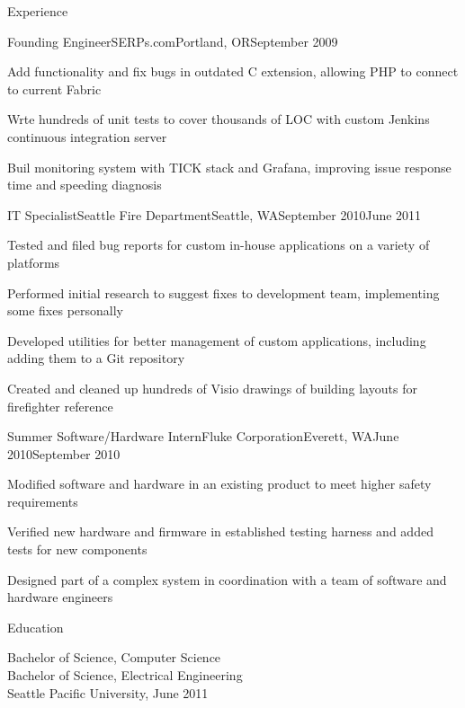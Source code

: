 \documentclass[letterpaper,12pt]{article}
\let\pt\pasttense
\begin{document}
\begin{paracol}{2}
\begin{res_section}{Experience}
\begin{res_experienceitem}{Founding Engineer}{SERPs.com}{Portland, OR}{September 2009}{{\pt[Present]{March 2017}}}
  \item Add\pt{ed} functionality and fix\pt{ed} bugs in outdated C extension, allowing PHP to connect to current Fabric
  \item Wr\pt[i]{o}te hundreds of unit tests to cover thousands of LOC with custom Jenkins continuous integration server
  \item Buil\pt[d]{t} monitoring system with TICK stack and Grafana, improving issue response time and speeding diagnosis
\end{res_experienceitem}
\begin{res_experienceitem}{IT Specialist}{Seattle Fire Department}{Seattle, WA}{September 2010}{June 2011}
  \item Tested and filed bug reports for custom in-house applications on a variety of platforms
  \item Performed initial research to suggest fixes to development team, implementing some fixes personally
  \item Developed utilities for better management of custom applications, including adding them to a Git repository
  \item Created and cleaned up hundreds of Visio drawings of building layouts for firefighter reference
\end{res_experienceitem}
\begin{res_experienceitem}{Summer Software/Hardware Intern}{Fluke Corporation}{Everett, WA}{June 2010}{September 2010}
  \item Modified software and hardware in an existing product to meet higher safety requirements
  \item Verified new hardware and firmware in established testing harness and added tests for new components
  \item Designed part of a complex system in coordination with a team of software and hardware engineers
\end{res_experienceitem}
\end{res_section}

\begin{res_section}{Education}
\begin{res_content}{Bachelor of Science, Computer Science\\
  Bachelor of Science, Electrical Engineering\\
  \textnormal{
      \sffamily
      \normalsize
      \hfill
      Seattle Pacific University, June 2011}\\
}
\end{res_content}
\end{res_section}

\end{paracol}
\end{document}
